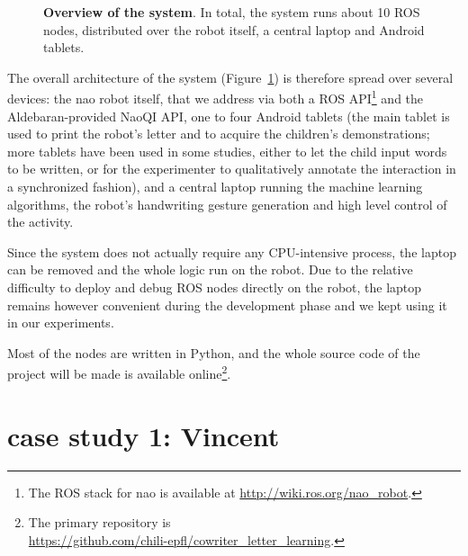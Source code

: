 \documentclass{sig-alternate}
\begin{document}
\begin{figure}[ht!]
{
}

\caption{\small \textbf{Overview of the system}. In total, the system runs about 10 ROS nodes,
    distributed over the robot itself, a central laptop and Android tablets.}

    \label{fig:archi}
\end{figure}

The overall architecture of the system (Figure~\ref{fig:archi}) is therefore
spread over several devices: the {\sc nao} robot itself, that we address via
both a ROS API\footnote{The ROS stack for {\sc nao} is available at 
\url{http://wiki.ros.org/nao_robot}.} and the Aldebaran-provided NaoQI API, one
to four Android tablets (the main tablet is used to print the robot's letter and
to acquire the children's demonstrations; more tablets have been used in some
studies, either to let the child input words to be written, or for the
experimenter to qualitatively annotate the interaction in a synchronized
fashion), and a central laptop running the machine learning algorithms, the
robot's handwriting gesture generation and high level control of the activity.

Since the system does not actually require any CPU-intensive process, the laptop
can be removed and the whole logic run on the robot. Due to the relative
difficulty to deploy and debug ROS nodes directly on the robot, the laptop
remains however convenient during the development phase and we kept using it in
our experiments.

Most of the nodes are written in Python, and the whole source code of the
project will be made is available online\footnote{The primary repository is\\ 
\url{https://github.com/chili-epfl/cowriter_letter_learning}.}.


\section{case study 1: Vincent}\label{Vincent}
\end{document}
